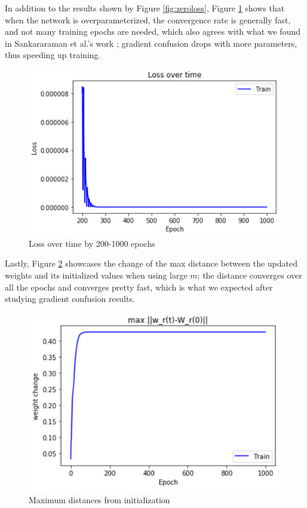 \documentclass{article}
\begin{document}
In addition to the results shown by Figure \ref{fig:zeroloss}, Figure \ref{fig:twohundredloss} shows that when the network is overparameterized, the convergence rate is generally fast, and not many training epochs are needed, which also agrees with what we found in Sankararaman et al.'s work \cite{gradient_confusion}; gradient confusion drops with more parameters, thus speeding up training.

\begin{figure}[htb]
	\centering
    \includegraphics[scale = 0.5]{pics/overparameterization/loss_over_time_200-1k.jpg}
    \caption{Loss over time by 200-1000 epochs}
	\label{fig:twohundredloss}
\end{figure}

Lastly, Figure \ref{fig:maxdistanceloss} showcases the change of the max distance between the updated weights and its initialized values when using large $m$; the distance converges over all the epochs and converges pretty fast, which is what we expected after studying gradient confusion results. 

\begin{figure}[htb]
	\centering
    \includegraphics[scale = 0.5]{pics/overparameterization/max_weight_change.jpg}
    \caption{Maximum distances from initialization}
	\label{fig:maxdistanceloss}
\end{figure}
\end{document}
